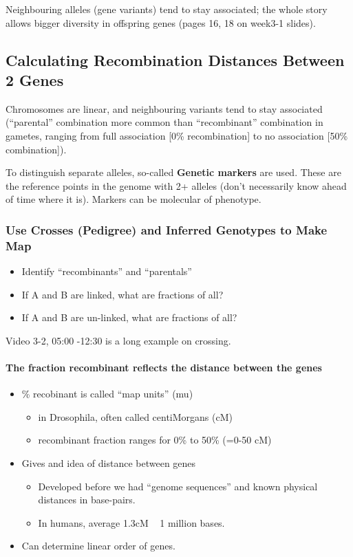 \documentclass{scrartcl}
\begin{document}
Neighbouring alleles (gene variants) tend to stay associated; the whole story allows bigger diversity in offspring genes (pages 16, 18 on week3-1 slides).

\subsection{Calculating Recombination Distances Between 2 Genes}
\label{sec:3-2}
Chromosomes are linear, and neighbouring variants tend to stay associated
(``parental'' combination more common than ``recombinant'' combination in
gametes, ranging from full association [0\% recombination] to no association
[50\% combination]).

To distinguish separate alleles, so-called {\bf Genetic markers} are used. These
are the reference points in the genome with 2+ alleles (don't necessarily know
ahead of time where it is). Markers can be molecular of phenotype.

\subsubsection{Use Crosses (Pedigree) and Inferred Genotypes to Make Map}
\label{sec:3-2-1}
\begin{itemize}
\item Identify ``recombinants'' and ``parentals''
\item If A and B are linked, what are fractions of all?
\item If A and B are un-linked, what are fractions of all?
\end{itemize}
Video 3-2, 05:00 -12:30 is a long example on crossing.

\paragraph{The fraction recombinant reflects the distance between the genes}

\begin{itemize}
\item \% recobinant is called ``map units'' (mu)
  \begin{itemize}
  \item in Drosophila, often called centiMorgans (cM)
  \item recombinant fraction ranges for 0\% to 50\% (=0-50 cM)
  \end{itemize}
\item Gives and idea of distance between genes
  \begin{itemize}
  \item Developed before we had ``genome sequences'' and known physical
    distances in base-pairs.
  \item In humans, average 1.3cM ~ 1 million bases.
  \end{itemize}
\item Can determine linear order of genes.
\end{itemize}
\end{document}
